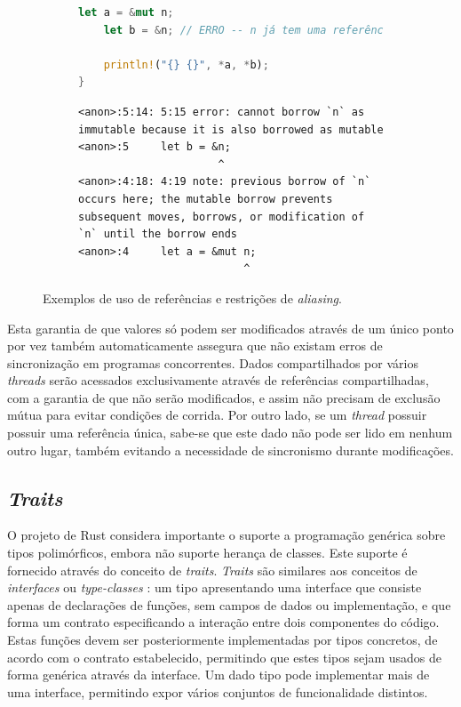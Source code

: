 \documentclass[tg]{mdtufsm}
\newcommand{\todo}[1]{}
\begin{document}
\begin{figure}
\begin{subfigure}[c]{0.48\textwidth}
\begin{lstlisting}[language=Rust]
	let a = &mut n;
	let b = &n; // ERRO -- n já tem uma referência mutável

	println!("{} {}", *a, *b);
}
	\end{lstlisting}
	\begin{lstlisting}[numbers=none, breaklines=true]
<anon>:5:14: 5:15 error: cannot borrow `n` as immutable because it is also borrowed as mutable
<anon>:5     let b = &n;
                      ^
<anon>:4:18: 4:19 note: previous borrow of `n` occurs here; the mutable borrow prevents subsequent moves, borrows, or modification of `n` until the borrow ends
<anon>:4     let a = &mut n;
                          ^
	\end{lstlisting}
	\caption{}
	\label{code:aliasing:mut2}
	\end{subfigure}
	\caption{Exemplos de uso de referências e restrições de \emph{aliasing}.}
	\label{code:aliasing}
\end{figure}

Esta garantia de que valores só podem ser modificados através de um único ponto por vez também automaticamente assegura que não existam erros de sincronização em programas concorrentes. Dados compartilhados por vários \emph{threads} serão acessados exclusivamente através de referências compartilhadas, com a garantia de que não serão modificados, e assim não precisam de exclusão mútua para evitar condições de corrida. Por outro lado, se um \emph{thread} possuir possuir uma referência única, sabe-se que este dado não pode ser lido em nenhum outro lugar, também evitando a necessidade de sincronismo durante modificações.

\subsection{\emph{Traits}}

O projeto de Rust considera importante o suporte a programação genérica sobre tipos polimórficos, embora não suporte herança de classes. Este suporte é fornecido através do conceito de \emph{traits}. \emph{Traits} são similares aos conceitos de \emph{interfaces} ou \emph{type-classes} \citep{wadler1989}: um tipo apresentando uma interface que consiste apenas de declarações de funções, sem campos de dados ou implementação, e que forma um contrato especificando a interação entre dois componentes do código. Estas funções devem ser posteriormente implementadas por tipos concretos, de acordo com o contrato estabelecido, permitindo que estes tipos sejam usados de forma genérica através da interface. Um dado tipo pode implementar mais de uma interface, permitindo expor vários conjuntos de funcionalidade distintos. \citep{rust-guide} \todo{exemplo}
\end{document}
